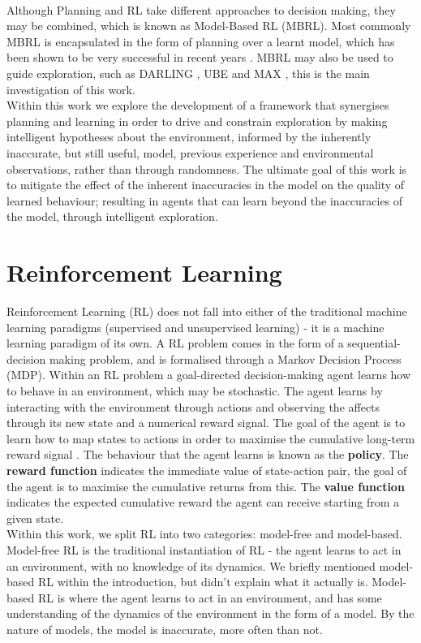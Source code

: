 \\Although Planning and RL take different approaches to decision making, they may be combined, which is known as Model-Based RL (MBRL). Most commonly MBRL is encapsulated in the form of planning over a learnt model, which has been shown to be very successful in recent years  \cite{silver2017mastering, pmlr-v28-levine13}. MBRL may also be used to guide exploration, such as DARLING \cite{AIJ16-leonetti}, UBE \cite{DBLP:journals/corr/abs-1709-05380} and MAX \cite{DBLP:journals/corr/abs-1810-12162}, this is the main investigation of this work.
\\Within this work we explore the development of a framework that synergises planning and learning in order to drive and constrain exploration by making intelligent hypotheses about the environment, informed by the inherently inaccurate, but still useful, model, previous experience and environmental observations, rather than through randomness. The ultimate goal of this work is to mitigate the effect of the inherent inaccuracies in the model on the quality of learned behaviour; resulting in agents that can learn beyond the inaccuracies of the model, through intelligent exploration.

\section{Reinforcement Learning}
Reinforcement Learning (RL) does not fall into either of the traditional machine learning paradigms (supervised and unsupervised learning) - it is a machine learning paradigm of its own. A RL problem comes in the form of a sequential-decision making problem, and is formalised through a Markov Decision Process (MDP). Within an RL problem a goal-directed decision-making agent learns how to behave in an environment, which may be stochastic. The agent learns by interacting with the environment through actions and observing the affects through its new state and a numerical reward signal. The goal of the agent is to learn how to map states to actions in order to maximise the cumulative long-term reward signal \cite{DBLP:books/lib/SuttonB98}. The behaviour that the agent learns is known as the \textbf{policy}. The \textbf{reward function} indicates the immediate value of state-action pair, the goal of the agent is to maximise the cumulative returns from this. The \textbf{value function} indicates the expected cumulative reward the agent can receive starting from a given state.
\\Within this work, we split RL into two categories: model-free and model-based. Model-free RL is the traditional instantiation of RL - the agent learns to act in an environment, with no knowledge of its dynamics. We briefly mentioned model-based RL within the introduction, but didn't explain what it actually is. Model-based RL is where the agent learns to act in an environment, and has some understanding of the dynamics of the environment in the form of a model. By the nature of models, the model is inaccurate, more often than not.

